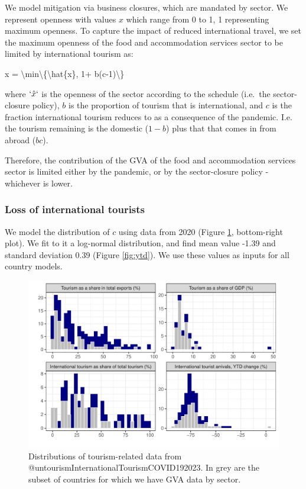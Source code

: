 \documentclass[
]{article}
\newenvironment{Shaded}{\begin{snugshade}}{\end{snugshade}}
\newcommand{\NormalTok}[1]{#1}
\begin{document}
We model mitigation via business closures, which are mandated by sector. We represent openness with values \(x\) which range from 0 to 1, 1 representing maximum openness. To capture the impact of reduced international travel, we set the maximum openness of the food and accommodation services sector to be limited by international tourism as:

\begin{Shaded}
\begin{Highlighting}[]
\NormalTok{x = \textbackslash{}min\textbackslash{}\{\textbackslash{}hat\{x\}, 1+ b(c{-}1)\textbackslash{}\}}
\end{Highlighting}
\end{Shaded}

where \(`\hat{x}`\) is the openness of the sector according to the schedule (i.e.~the sector-closure policy), \(b\) is the proportion of tourism that is international, and \(c\) is the fraction international tourism reduces to as a consequence of the pandemic. I.e. the tourism remaining is the domestic (\(1-b\)) plus that that comes in from abroad (\(bc\)).

Therefore, the contribution of the GVA of the food and accommodation services sector is limited either by the pandemic, or by the sector-closure policy - whichever is lower.

\subsubsection{Loss of international tourists}\label{loss-of-international-tourists}

We model the distribution of \(c\) using data from 2020 (Figure \ref{fig:tourismhist}, bottom-right plot). We fit to it a log-normal distribution, and find mean value -1.39 and standard deviation 0.39 (Figure \ref{fig:ytd}). We use these values as inputs for all country models.

\begin{figure}

{\centering \includegraphics[width=0.5\linewidth]{README_files/figure-latex/tourismhist-1} 

}

\caption{Distributions of tourism-related data from @untourismInternationalTourismCOVID192023. In grey are the subset of countries for which we have GVA data by sector.}\label{fig:tourismhist}
\end{figure}
\end{document}
